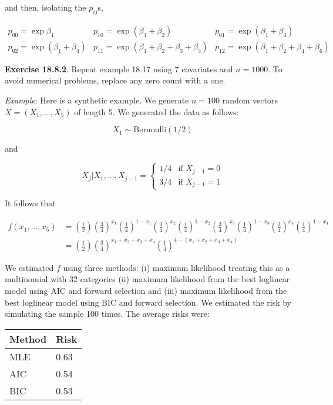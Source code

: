 and then, isolating the \(p_{ij}\)s,

\[
\begin{array}{ccc}
p_{00} = \exp \beta_{1} &
p_{10} = \exp \left( \beta_{1} + \beta_{2} \right) &
p_{01} = \exp \left( \beta_{1} + \beta_{3} \right) \\
p_{02} = \exp \left( \beta_{1} + \beta_{4} \right) &
p_{11} = \exp \left( \beta_{1} + \beta_{2} + \beta_{3} + \beta_{5} \right) &
p_{12} = \exp \left( \beta_{1} + \beta_{2} + \beta_{4} + \beta_{6} \right)
\end{array}
\]

\textbf{Exercise 18.8.2}. Repeat example 18.17 using 7 covariates and
\(n = 1000\). To avoid numerical problems, replace any zero count with a
one.

\emph{Example}: Here is a synthetic example. We generate \(n = 100\)
random vectors \(X = (X_{1}, \dots, X_{5})\) of length 5. We generated the
data as follows:

\[ X_{1} \sim \text{Bernoulli}(1/2)\]

and

\[ X_{j} | X_{1}, \dots, X_{j-1} = \begin{cases}
1/4 & \text{if } X_{j-1} = 0 \\
3/4 & \text{if } X_{j-1} = 1
\end{cases}\]

It follows that

\begin{align*}
f(x_{1}, \dots, x_{5}) &= 
\left( \frac{1}{2} \right) \left( \frac{3}{4} \right)^{x_{1}} \left( \frac{1}{4} \right)^{1 - x_{1}} \left( \frac{3}{4} \right)^{x_{2}} \left( \frac{1}{4} \right)^{1 - x_{2}} \left( \frac{3}{4} \right)^{x_{3}} \left( \frac{1}{4} \right)^{1 - x_{3}} \left( \frac{3}{4} \right)^{x_{4}} \left( \frac{1}{4} \right)^{1 - x_{4}} \\
&= \left( \frac{1}{2} \right) \left( \frac{3}{4} \right)^{x_{1} + x_{2} + x_{3} + x_{4}} \left( \frac{1}{4} \right)^{4 - (x_{1} + x_{2} + x_{3} + x_{4})} 
\end{align*}

We estimated \(f\) using three methods: (i) maximum likelihood treating
this as a multinomial with 32 categories (ii) maximum likelihood from
the best loglinear model using AIC and forward selection and (iii)
maximum likelihood from the best loglinear model using BIC and forward
selection. We estimated the risk by simulating the sample 100 times. The
average risks were:

\begin{tabular}{@{}ll@{}}
\toprule
Method & Risk \\
\midrule
MLE & 0.63 \\
AIC & 0.54 \\
BIC & 0.53 \\
\bottomrule
\end{tabular}

